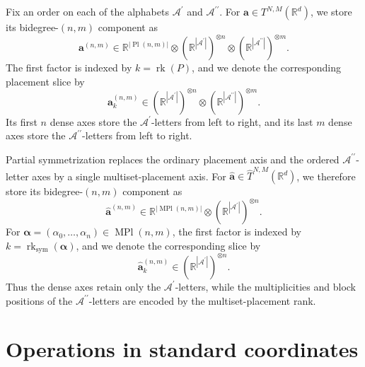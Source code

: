 \documentclass{amsart}
\theoremstyle{definition}
\theoremstyle{remark}
\begin{document}
Fix an order on each of the alphabets
$\mathcal{A}^{\prime}$ and $\mathcal{A}^{\prime\prime}$. For
$\mathbf{a}\in T^{N,M}(\mathbb{R}^d)$, we store its bidegree-$(n,m)$
component as
\begin{equation}
    \label{eq:mixed_block_layout}
    \mathbf{a}^{(n,m)}
    \in
    \mathbb{R}^{|\operatorname{Pl}(n,m)|}
    \otimes
    \left(
        \mathbb{R}^{|\mathcal{A}^{\prime}|}
    \right)^{\otimes n}
    \otimes
    \left(
        \mathbb{R}^{|\mathcal{A}^{\prime\prime}|}
    \right)^{\otimes m}.
\end{equation}
The first factor is indexed by
$k=\operatorname{rk}(P)$, and we denote the corresponding placement slice
by
\[
    \mathbf{a}^{(n,m)}_k
    \in
    \left(
        \mathbb{R}^{|\mathcal{A}^{\prime}|}
    \right)^{\otimes n}
    \otimes
    \left(
        \mathbb{R}^{|\mathcal{A}^{\prime\prime}|}
    \right)^{\otimes m}.
\]
Its first $n$ dense axes store the $\mathcal{A}^{\prime}$-letters from
left to right, and its last $m$ dense axes store the
$\mathcal{A}^{\prime\prime}$-letters from left to right.

Partial symmetrization replaces the ordinary placement axis and the ordered
$\mathcal{A}^{\prime\prime}$-letter axes by a single multiset-placement
axis. For
$\widehat{\mathbf a}\in\widehat{T}^{N,M}(\mathbb{R}^d)$, we therefore
store its bidegree-$(n,m)$ component as
\begin{equation}
    \label{eq:symmetrized_block_layout}
    \widehat{\mathbf a}^{(n,m)}
    \in
    \mathbb{R}^{|\operatorname{MPl}(n,m)|}
    \otimes
    \left(
        \mathbb{R}^{|\mathcal{A}^{\prime}|}
    \right)^{\otimes n}.
\end{equation}
For
$\boldsymbol{\alpha}
=(\alpha_0,\ldots,\alpha_n)
\in\operatorname{MPl}(n,m)$,
the first factor is indexed by
$k=\operatorname{rk}_{\mathrm{sym}}(\boldsymbol{\alpha})$, and we denote
the corresponding slice by
\[
    \widehat{\mathbf a}^{(n,m)}_k
    \in
    \left(
        \mathbb{R}^{|\mathcal{A}^{\prime}|}
    \right)^{\otimes n}.
\]
Thus the dense axes retain only the
$\mathcal{A}^{\prime}$-letters, while the multiplicities and block
positions of the $\mathcal{A}^{\prime\prime}$-letters are encoded by the
multiset-placement rank.



\section{Operations in standard coordinates}
\label{sec:standard_coordinate_operations}
\end{document}
